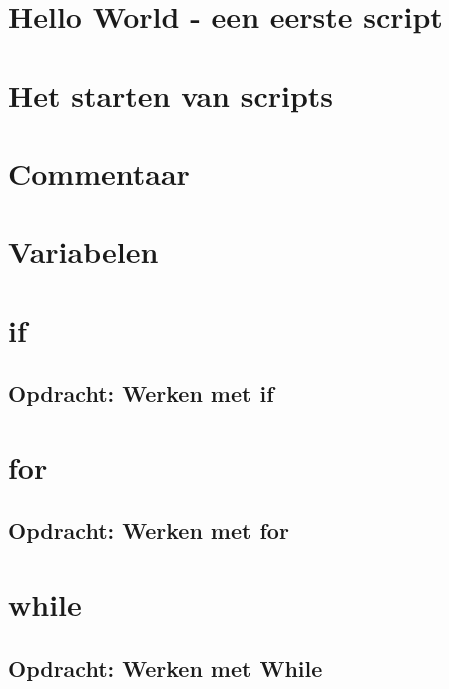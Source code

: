 \documentclass[a4paper,12pt,twoside,openright,titlepage]{book}
\begin{document}
\section{Hello World - een eerste script}

\section{Het starten van scripts}

\section{Commentaar}

\section{Variabelen}

\section{if}

\subsection{Opdracht: Werken met if}

\section{for}

\subsection{Opdracht: Werken met for}

\section{while}

\subsection{Opdracht: Werken met While}


\backmatter
\printindex
\end{document}
